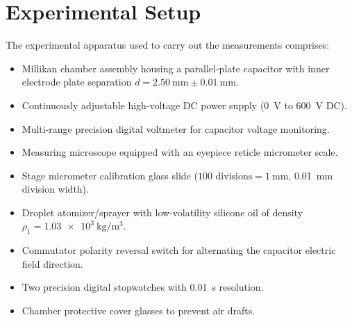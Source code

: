 \documentclass[journal]{IEEEtran}
\begin{document}
\section{Experimental Setup}
The experimental apparatus used to carry out the measurements comprises:
\begin{itemize}
    \item Millikan chamber assembly housing a parallel-plate capacitor with inner electrode plate separation $d = \SI{2.50}{\milli\meter} \pm \SI{0.01}{\milli\meter}$.
    \item Continuously adjustable high-voltage DC power supply (\SI{0}{\volt} to \SI{600}{\volt} DC).
    \item Multi-range precision digital voltmeter for capacitor voltage monitoring.
    \item Measuring microscope equipped with an eyepiece reticle micrometer scale.
    \item Stage micrometer calibration glass slide ($100\text{ divisions} = \SI{1}{\milli\meter}$, \SI{0.01}{\milli\meter} division width).
    \item Droplet atomizer/sprayer with low-volatility silicone oil of density $\rho_1 = \SI{1.03e3}{\kilogram\per\meter\cubed}$.
    \item Commutator polarity reversal switch for alternating the capacitor electric field direction.
    \item Two precision digital stopwatches with \SI{0.01}{\second} resolution.
    \item Chamber protective cover glasses to prevent air drafts.
\end{itemize}

\end{document}
